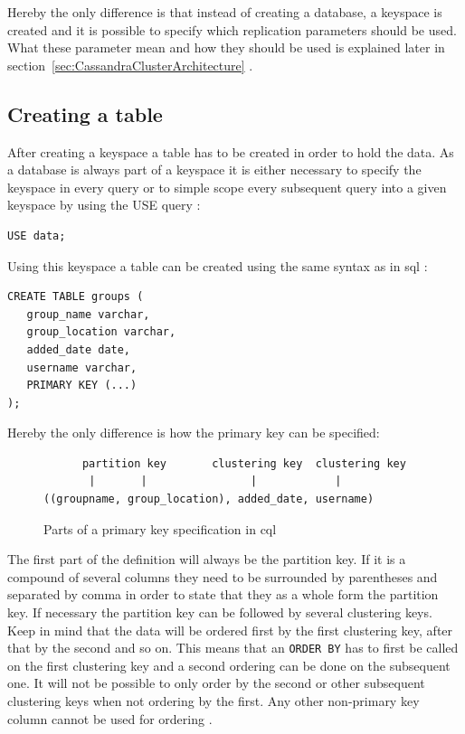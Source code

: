 Hereby the only difference is that instead of creating a database, a keyspace is created and it is possible to specify which replication parameters should be used. What these parameter mean and how they should be used is explained later in section~\ref{sec:CassandraClusterArchitecture} \autocite{cqlAlexMeng}.

\subsection{Creating a table}
After creating a keyspace a table has to be created in order to hold the data. As a database is always part of a keyspace it is either necessary to specify the keyspace in every query or to simple scope every subsequent query into a given keyspace by using the USE query \autocite{cassandra3cqldocUse}:
\begin{verbatim}
USE data;
\end{verbatim}

Using this keyspace a table can be created using the same syntax as in \gls{sql} \autocite{cqlAlexMeng, newInCQL3, cassandra3cqldocCreateTable}:
\begin{verbatim}
CREATE TABLE groups (
   group_name varchar,
   group_location varchar,
   added_date date,
   username varchar,
   PRIMARY KEY (...)
);
\end{verbatim}

Hereby the only difference is how the primary key can be specified:

\begin{figure}[ht]
    \centering
\begin{verbatim}
      partition key       clustering key  clustering key
       |       |                |            |
((groupname, group_location), added_date, username)
\end{verbatim}
    \caption{Parts of a primary key specification in \gls{cql} \autocite{cqlPrimaryKeyDefinition}}
    \label{fig:cassandra:primaryKeyDefinition}
\end{figure}

The first part of the definition will always be the partition key. If it is a compound of several columns they need to be surrounded by parentheses and separated by comma in order to state that they as a whole form the partition key. If necessary the partition key can be followed by several clustering keys. Keep in mind that the data will be ordered first by the first clustering key, after that by the second and so on. This means that an \texttt{ORDER BY} has to first be called on the first clustering key and a second ordering can be done on the subsequent one. It will not be possible to only order by the second or other subsequent clustering keys when not ordering by the first. Any other non-primary key column cannot be used for ordering \autocite{cqlPrimaryKeyDefinition, cassandra3cqldocCreateTable}.

